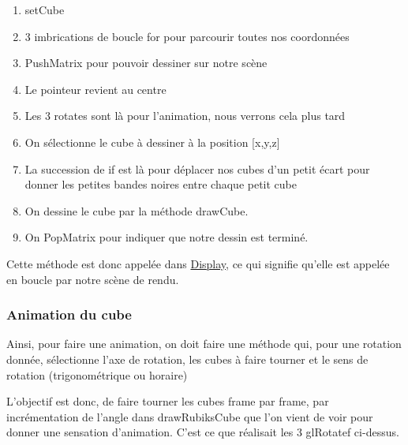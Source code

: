\begin{enumerate}
    \item setCube
    \item 3 imbrications de boucle for pour parcourir toutes nos coordonnées
    \item PushMatrix pour pouvoir dessiner sur notre scène
    \item Le pointeur revient au centre
    \item Les 3 rotates sont là pour l’animation, nous verrons cela plus tard
    \item On sélectionne le cube à dessiner à la position [x,y,z]
    \item La succession de if est là pour déplacer nos cubes d’un petit écart pour donner les petites bandes noires entre chaque petit cube
    \item On dessine le cube par la méthode drawCube.
    \item On PopMatrix pour indiquer que notre dessin est terminé.
\end{enumerate}

Cette méthode est donc appelée dans \underline{Display}, ce qui signifie qu’elle est appelée en boucle par notre scène de rendu.

\subsubsection{Animation du cube}
Ainsi, pour faire une animation, on doit faire une méthode qui, pour une rotation donnée, sélectionne l’axe de rotation, les cubes à faire tourner et le sens de rotation (trigonométrique ou horaire)

L’objectif est donc, de faire tourner les cubes frame par frame, par incrémentation de l’angle dans drawRubiksCube que l’on vient de voir pour donner une sensation d’animation. C’est ce que réalisait les 3 glRotatef ci-dessus.

